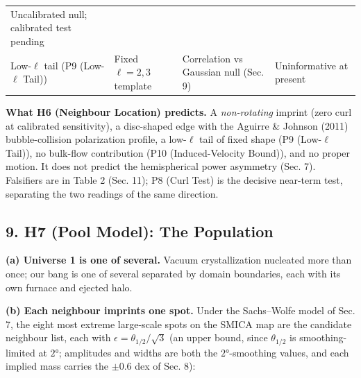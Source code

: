 \documentclass[
]{article}
\begin{document}
\begin{longtable}[]{@{}llll@{}}
\begin{minipage}[t]{0.22\columnwidth}
Uncalibrated null; calibrated test pending\strut
\end{minipage}\tabularnewline
\begin{minipage}[t]{0.22\columnwidth}\raggedright
Low-\(\ell\) tail (P9 (Low-\(\ell\) Tail))\strut
\end{minipage} & \begin{minipage}[t]{0.22\columnwidth}\raggedright
Fixed \(\ell=2,3\) template\strut
\end{minipage} & \begin{minipage}[t]{0.22\columnwidth}\raggedright
Correlation vs Gaussian null (Sec. 9)\strut
\end{minipage} & \begin{minipage}[t]{0.22\columnwidth}\raggedright
Uninformative at present\strut
\end{minipage}\tabularnewline
\bottomrule
\end{longtable}

\textbf{What H6 (Neighbour Location) predicts.} A \emph{non-rotating}
imprint (zero curl at calibrated sensitivity), a disc-shaped edge with
the Aguirre \& Johnson (2011) bubble-collision polarization profile, a
low-\(\ell\) tail of fixed shape (P9 (Low-\(\ell\) Tail)), no bulk-flow
contribution (P10 (Induced-Velocity Bound)), and no proper motion. It
does not predict the hemispherical power asymmetry (Sec. 7). Falsifiers
are in Table 2 (Sec. 11); P8 (Curl Test) is the decisive near-term test,
separating the two readings of the same direction.

\hypertarget{h7-pool-model-the-population}{%
\subsection{\texorpdfstring{\textbf{9. H7 (Pool Model): The
Population}}{9. H7 (Pool Model): The Population}}\label{h7-pool-model-the-population}}

\textbf{(a) Universe 1 is one of several.} Vacuum crystallization
nucleated more than once; our bang is one of several separated by domain
boundaries, each with its own furnace and ejected halo.

\textbf{(b) Each neighbour imprints one spot.} Under the Sachs--Wolfe
model of Sec. 7, the eight most extreme large-scale spots on the SMICA
map are the candidate neighbour list, each with
\(\epsilon = \theta_{1/2}/\sqrt{3}\) (an upper bound, since
\(\theta_{1/2}\) is smoothing-limited at \(2°\); amplitudes and widths
are both the \(2°\)-smoothing values, and each implied mass carries the
\(\pm 0.6\) dex of Sec. 8):
\end{document}
